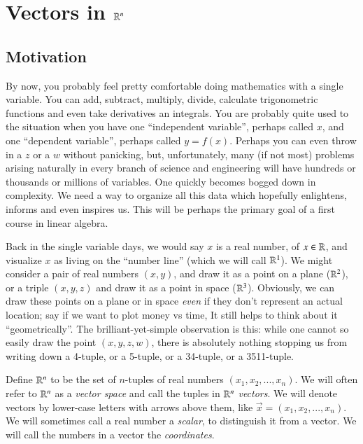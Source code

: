 \section{Vectors in $\mathbb{R}^n$}

\subsection{Motivation}

By now, you probably feel pretty comfortable doing mathematics with a single variable.
You can add, subtract, multiply, divide, calculate trigonometric functions and even take derivatives an integrals.  
You are probably quite used to the situation when you have one ``independent variable'', perhaps called $x$, and one ``dependent variable'', perhaps called $y=f(x)$.  
Perhaps you can even throw in a $z$ or a $w$ without panicking, but, unfortunately, many (if not most) problems arising naturally in every branch of science and engineering will have hundreds or thousands or millions of variables.  
One quickly becomes bogged down in complexity.
We need a way to organize all this data which hopefully enlightens, informs and even inspires us.
This will be perhaps the primary goal of a first course in linear algebra.  

Back in the single variable days, we would say $x$ is a real number, of $x\in \mathbb{R}$, and visualize $x$ as living on the ``number line'' (which we will call $\mathbb{R}^1$). 
We might consider a pair of real numbers $(x,y)$, and draw it as a point on a plane ($\mathbb{R}^2$), or a triple $(x,y,z)$ and draw it as a point in space ($\mathbb{R}^3$).  
Obviously, we can draw these points on a plane or in space \emph{even} if they don't represent an actual location; say if we want to plot money vs time, 
It still helps to think about it ``geometrically''.  
The brilliant-yet-simple observation is this:  
while one cannot so easily draw the point $(x,y,z,w)$, there is absolutely nothing stopping us from writing down a 4-tuple, or a 5-tuple, or a 34-tuple, or a 3511-tuple.

\begin{Def}
  Define $\mathbb{R}^n$ to be the set of $n$-tuples of real numbers $(x_1,x_2,...,x_n)$.  
  We will often refer to $\mathbb{R}^n$ as a \emph{vector space} and call the tuples in $\mathbb{R}^n$ \emph{vectors}.  
  We will denote vectors by lower-case letters with arrows above them, like $\vec{x}=(x_1,x_2,...,x_n)$.  
  We will sometimes call a real number a \emph{scalar}, to distinguish it from a vector.  
  We will call the numbers in a vector the \emph{coordinates}.  
\end{Def}


